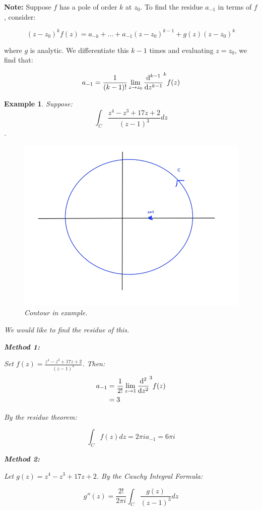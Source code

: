\documentclass{article}
\newtheorem{ex}{Example}
\theoremstyle{definition}
\begin{document}
\textbf{Note:} Suppose $f$ has a pole of order $k$ at $z_0$. To find the residue $a_{-1}$ in terms of $f$, consider:

$$(z-z_0)^k f(z) = a_{-k}+...+a_{-1}(z-z_0)^{k-1}+ g(z)(z-z_0)^k$$

where $g$ is analytic. We differentiate this $k-1$ times and evaluating $z=z_0$, we find that:

$$a_{-1} = \frac{1}{(k-1)!} \lim_{z \to z_0} \dv{{}^{k-1}}{z^{k-1}} (z-z_0)^k f(z)$$

\begin{ex}
Suppose:
$$\int_C \frac{z^4-z^3+17z+2}{(z-1)^3}dz$$. 

\begin{figure}[H]
	\centering
	\includegraphics[width=0.5\linewidth]{contour_Ex}
	\caption{Contour in example.}
	\label{fig:contourex}
\end{figure}

We would like to find the residue of this. 

\textbf{Method 1:}

Set $f(z) =  \frac{z^4-z^3+17z+2}{(z-1)^3}$. Then:
\begin{align}
a_{-1} &= \frac{1}{2!} \lim_{z\to1} \dv{^2}{z^2} (z-1)^3 f(z) \\ 
&= 3
\end{align}

By the residue theorem:

$$\int_C f(z) dz = 2 \pi i  a_{-1} = 6 \pi i$$


\textbf{Method 2:}

Let $g(z) =  z^4-z^3+17z+2$. By the Cauchy Integral Formula:

$$g''(z) = \frac{2!}{2\pi i }\int_C \frac{g(z)}{(z-1)^3}dz$$
\end{ex}
\end{document}
